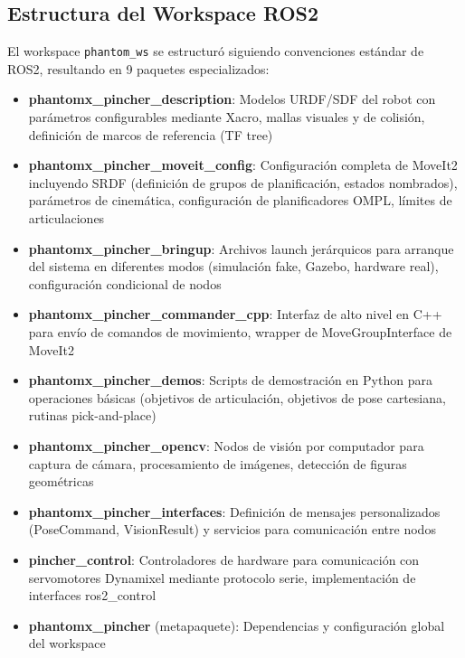 \subsection{Estructura del Workspace ROS2}

El workspace \texttt{phantom\_ws} se estructuró siguiendo convenciones estándar de ROS2, resultando en 9 paquetes especializados:

\begin{itemize}
    \item \textbf{phantomx\_pincher\_description}: Modelos URDF/SDF del robot con parámetros configurables mediante Xacro, mallas visuales y de colisión, definición de marcos de referencia (TF tree)
    
    \item \textbf{phantomx\_pincher\_moveit\_config}: Configuración completa de MoveIt2 incluyendo SRDF (definición de grupos de planificación, estados nombrados), parámetros de cinemática, configuración de planificadores OMPL, límites de articulaciones
    
    \item \textbf{phantomx\_pincher\_bringup}: Archivos launch jerárquicos para arranque del sistema en diferentes modos (simulación fake, Gazebo, hardware real), configuración condicional de nodos
    
    \item \textbf{phantomx\_pincher\_commander\_cpp}: Interfaz de alto nivel en C++ para envío de comandos de movimiento, wrapper de MoveGroupInterface de MoveIt2
    
    \item \textbf{phantomx\_pincher\_demos}: Scripts de demostración en Python para operaciones básicas (objetivos de articulación, objetivos de pose cartesiana, rutinas pick-and-place)
    
    \item \textbf{phantomx\_pincher\_opencv}: Nodos de visión por computador para captura de cámara, procesamiento de imágenes, detección de figuras geométricas
    
    \item \textbf{phantomx\_pincher\_interfaces}: Definición de mensajes personalizados (PoseCommand, VisionResult) y servicios para comunicación entre nodos
    
    \item \textbf{pincher\_control}: Controladores de hardware para comunicación con servomotores Dynamixel mediante protocolo serie, implementación de interfaces ros2\_control
    
    \item \textbf{phantomx\_pincher} (metapaquete): Dependencias y configuración global del workspace
\end{itemize}

